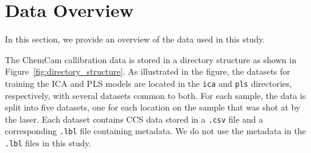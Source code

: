 \section{Data Overview}\label{subsec:data_overview}
In this section, we provide an overview of the data used in this study.

The ChemCam callibration data is stored in a directory structure as shown in Figure~\ref{fig:directory_structure}.
As illustrated in the figure, the datasets for training the ICA and PLS models are located in the \texttt{ica} and \texttt{pls} directories, respectively, with several datasets common to both.
For each sample, the data is split into five datasets, one for each location on the sample that was shot at by the laser.
Each dataset contains CCS data stored in a \texttt{.csv} file and a corresponding \texttt{.lbl} file containing metadata.
We do not use the metadata in the \texttt{.lbl} files in this study.

